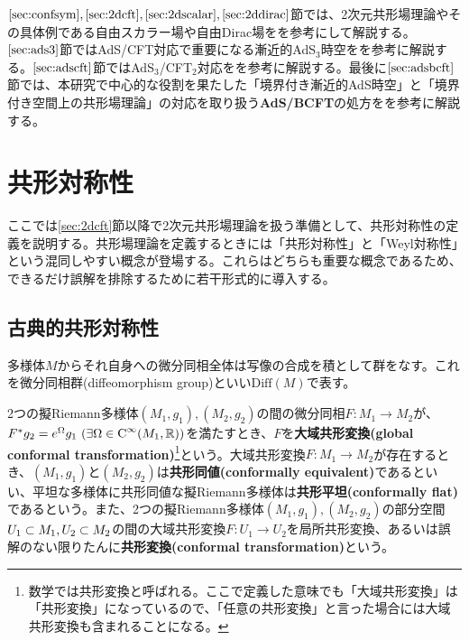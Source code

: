 $\ref{sec:confsym},\ref{sec:2dcft},\ref{sec:2dscalar},\ref{sec:2ddirac}$節では、2次元共形場理論やその具体例である自由スカラー場や自由Dirac場を\cite{EguchiSugawara}\cite{NakaharaTop1}\cite{NakaharaTop2}\cite{NakayamaCFT}\cite{polchinski1998string1}\cite{polchinski1998string2}\cite{francesco2012conformal}を参考にして解説する。$\ref{sec:ads3}$節ではAdS/CFT対応で重要になる漸近的AdS$_3$時空を\cite{FukumaSakatani}\cite{Banados:1998gg}\cite{Donnay:2016iyk}を参考に解説する。$\ref{sec:adscft}$節ではAdS$_3$/CFT$_2$対応を\cite{TakayanagiJapan}\cite{Natsuume}\cite{Klebanov:2000me}\cite{Banerjee}を参考に解説する。最後に$\ref{sec:adsbcft}$節では、本研究で中心的な役割を果たした「境界付き漸近的AdS時空」と「境界付き空間上の共形場理論」の対応を取り扱う\textbf{AdS/BCFT}の処方を\cite{Takayanagi:2011zk}\cite{Fujita:2011fp}を参考に解説する。

\section{共形対称性}\label{sec:confsym}
ここでは\ref{sec:2dcft}節以降で2次元共形場理論を扱う準備として、共形対称性の定義を説明する。共形場理論を定義するときには「共形対称性」と「Weyl対称性」という混同しやすい概念が登場する。これらはどちらも重要な概念であるため、できるだけ誤解を排除するために若干形式的に導入する。

\subsection{古典的共形対称性}\label{subsecclassicalconfsym}
多様体$M$からそれ自身への微分同相全体は写像の合成を積として群をなす。これを微分同相群(diffeomorphism group)といい$\text{Diff}(M)$で表す。

2つの擬Riemann多様体$(M_1,g_1),(M_2,g_2)$の間の微分同相$F\colon M_1\to M_2$が、$F^\ast g_2=e^\Omega g_1\ (\exists\Omega\in\text{C}^\infty(M_1,\R))$を満たすとき、$F$を\textbf{大域共形変換(global conformal transformation)}\footnote{数学では共形変換と呼ばれる。ここで定義した意味でも「大域共形変換」は「共形変換」になっているので、「任意の共形変換」と言った場合には大域共形変換も含まれることになる。}という。大域共形変換$F\colon M_1\to M_2$が存在するとき、$(M_1,g_1)$と$(M_2,g_2)$は\textbf{共形同値(conformally equivalent)}であるといい、平坦な多様体に共形同値な擬Riemann多様体は\textbf{共形平坦(conformally flat)}であるという。また、2つの擬Riemann多様体$(M_1,g_1),(M_2,g_2)$の部分空間$U_1\subset M_1,U_2\subset M_2$の間の大域共形変換$F\colon U_1\to U_2$を局所共形変換、あるいは誤解のない限りたんに\textbf{共形変換(conformal transformation)}という。

